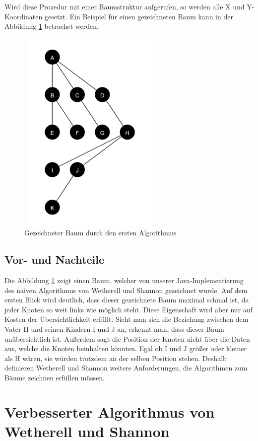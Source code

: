 Wird diese Prozedur mit einer Baumstruktur aufgerufen, so werden alle X und Y-Koordinaten gesetzt.
Ein Beispiel für einen gezeichneten Baum kann in der Abbildung \ref{pic:baum_algo_1} betrachet werden.

\begin{figure}
    \centering
    \includegraphics[width=7cm, height=10cm]{abbildungen/baum_algo_1}
    \caption{Gezeichneter Baum durch den ersten Algorithmus}
    \label{pic:baum_algo_1} 
\end{figure}

\subsection{Vor- und Nachteile}
Die Abbildung \ref{pic:baum_algo_1} zeigt einen Baum, welcher von unserer Java-Implementierung des naiven Algorithmus von Wetherell und Shannon
gezeichnet wurde.
Auf dem ersten Blick wird deutlich, dass dieser gezeichnete Baum maximal schmal ist, da jeder Knoten so weit links wie möglich steht.
Diese Eigenschaft wird aber nur auf Kosten der Übersichtlichkeit erfüllt. Sieht man sich die Beziehung zwischen dem Vater H und seinen Kindern
I und J an, erkennt man, dass dieser Baum unübersichtlich ist. Außerdem sagt die Position der Knoten nicht über die Daten aus, welche die Knoten
beinhalten könnten. Egal ob I und J größer oder kleiner als H wären, sie würden trotzdem an der selben Position stehen. Deshalb definieren
Wetherell und Shannon weitere Anforderungen, die Algorithmen zum Bäume zeichnen erfüllen müssen. 
\section{Verbesserter Algorithmus von Wetherell und Shannon}

